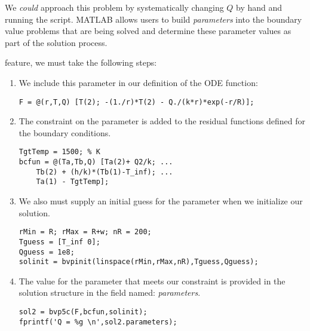 We \emph{could} approach this problem by systematically changing $Q$ by hand and running the script.  MATLAB allows users to build \emph{parameters} into the boundary value problems that are being solved and determine these parameter values as part of the solution process.

 feature, we must take the following steps:
\begin{enumerate}
\item We include this parameter in our definition of the ODE function:
\begin{lstlisting}[style=myMatlab]
% add Q to my arguments for F
F = @(r,T,Q) [T(2); -(1./r)*T(2) - Q./(k*r)*exp(-r/R)];
\end{lstlisting}

\item The constraint on the parameter is added to the residual functions defined for the boundary conditions.

\begin{lstlisting}[style=myMatlab]
TgtTemp = 1500; % K
bcfun = @(Ta,Tb,Q) [Ta(2)+ Q2/k; ...
    Tb(2) + (h/k)*(Tb(1)-T_inf); ...
    Ta(1) - TgtTemp];
\end{lstlisting}

\item We also must supply an initial guess for the parameter when we initialize our solution.

\begin{lstlisting}[style=myMatlab]
rMin = R; rMax = R+w; nR = 200;
Tguess = [T_inf 0];
Qguess = 1e8;
solinit = bvpinit(linspace(rMin,rMax,nR),Tguess,Qguess);
\end{lstlisting}

\item The value for the parameter that meets our constraint is provided in the solution structure in the field named: \emph{parameters}.

\begin{lstlisting}[style=myMatlab]
sol2 = bvp5c(F,bcfun,solinit);
fprintf('Q = %g \n',sol2.parameters);
\end{lstlisting}

\end{enumerate}

